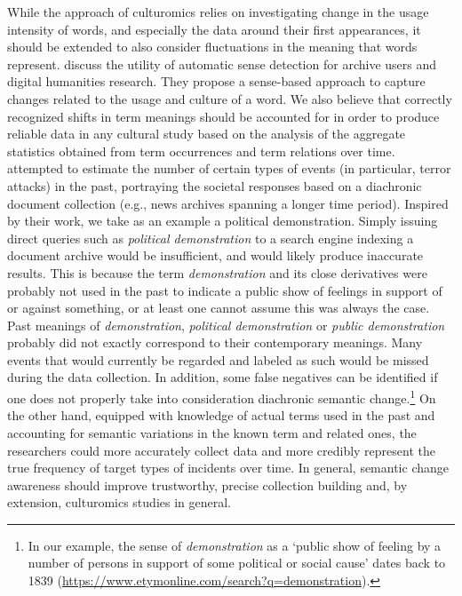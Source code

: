 \documentclass[output=paper]{langsci/langscibook}
\begin{document}
While the approach of culturomics relies on investigating change in the usage intensity of words, and especially the data around their first appearances, it should be extended to also consider fluctuations in the meaning that words represent. \citet{tahmasebi2017uses} discuss the utility of automatic sense detection for archive users and  digital humanities research. They propose a sense-based approach to capture changes related to the usage and culture of a word. We also believe that correctly recognized shifts in term meanings should be accounted for in order to produce reliable data in any cultural study based on the analysis of the aggregate statistics obtained from term occurrences and term relations over time. \citet{dblp:conf/histoinfo/fridlundobb19} attempted to estimate the number of certain types of events (in particular, terror attacks) in the past,  portraying the societal responses based on a diachronic document collection (e.g., news archives spanning a longer time period). Inspired by their work, we take as an example a political demonstration.
Simply issuing direct queries such as \emph{political demonstration} to a search engine indexing a document archive would be insufficient, and would likely produce inaccurate results. This is because the term \emph{demonstration} and its close derivatives were probably not used in the past to indicate a public show of feelings in support of or against something, or at least one cannot assume this was always the case. Past meanings of \emph{demonstration}, \emph{political demonstration} or \emph{public demonstration} probably did not exactly correspond to their contemporary meanings. Many events that would currently be regarded and labeled as such would  be missed during the data collection. In addition, some false negatives can  be identified if one does not properly take into consideration diachronic semantic change.\footnote{In our example, the sense of \emph{demonstration} as a `public show of feeling by a number of persons in support of some political or social cause' dates back to 1839 (\url{https://www.etymonline.com/search?q=demonstration}).} On the other hand, equipped with  knowledge of actual terms used in the past and accounting for semantic variations in the known term and related ones, the researchers could more accurately collect data and more credibly represent the true frequency of target types of incidents over time. In general, semantic change awareness should improve trustworthy, precise collection building and, by extension, culturomics studies in general. 
\end{document}
